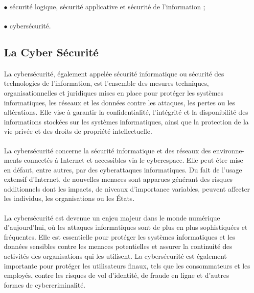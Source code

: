 \documentclass{report}
\begin{document}
 \paragraph{ }
   \textendash \space$\bullet$ sécurité logique, sécurité applicative et sécurité de l’information ;
   
   \paragraph{ }
   \textendash \space$\bullet$ cybersécurité.
   
  \subsection{ La Cyber Sécurité }
  \paragraph{ }
  La cybersécurité, également appelée sécurité informatique ou sécurité des technologies de l'information, est l'ensemble des mesures techniques, organisationnelles et juridiques mises en place pour protéger les systèmes informatiques, les réseaux et les données contre les attaques, les pertes ou les altérations. Elle vise à garantir la confidentialité, l'intégrité et la disponibilité des informations stockées sur les systèmes informatiques, ainsi que la protection de la vie privée et des droits de propriété intellectuelle.
  \paragraph{ }
  La cybersécurité concerne la sécurité informatique et des réseaux des environne-
ments connectés à Internet et accessibles via le cyberespace. Elle peut être mise en
défaut, entre autres, par des cyberattaques informatiques. Du fait de l’usage extensif
d’Internet, de nouvelles menaces sont apparues générant des risques additionnels
dont les impacts, de niveaux d’importance variables, peuvent affecter les individus,
les organisations ou les États. 
   \paragraph{ }
  La cybersécurité est devenue un enjeu majeur dans le monde numérique d'aujourd'hui, où les attaques informatiques sont de plus en plus sophistiquées et fréquentes. Elle est essentielle pour protéger les systèmes informatiques et les données sensibles contre les menaces potentielles et assurer la continuité des activités des organisations qui les utilisent. La cybersécurité est également importante pour protéger les utilisateurs finaux, tels que les consommateurs et les employés, contre les risques de vol d'identité, de fraude en ligne et d'autres formes de cybercriminalité.
\end{document}
